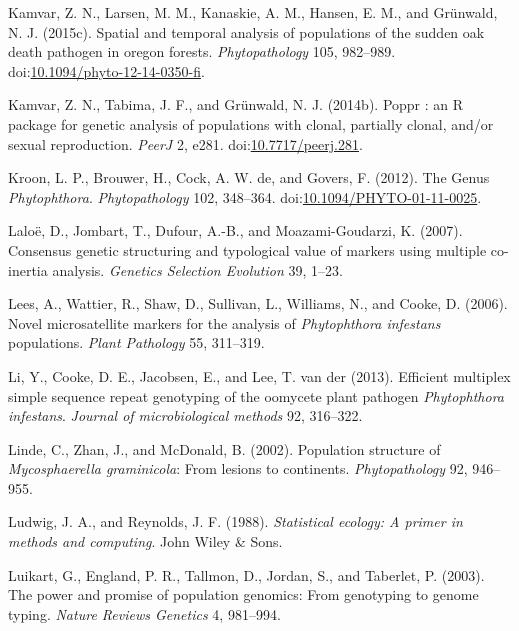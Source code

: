 \documentclass[double,12pt]{beavtex}
\begin{document}
  \hypertarget{ref-kamvar2015spatial}{}
  Kamvar, Z. N., Larsen, M. M., Kanaskie, A. M., Hansen, E. M., and
  Grünwald, N. J. (2015c). Spatial and temporal analysis of populations of
  the sudden oak death pathogen in oregon forests. \emph{Phytopathology}
  105, 982--989.
  doi:\href{https://doi.org/10.1094/phyto-12-14-0350-fi}{10.1094/phyto-12-14-0350-fi}.
  
  \hypertarget{ref-kamvar2014poppr}{}
  Kamvar, Z. N., Tabima, J. F., and Grünwald, N. J. (2014b). Poppr : an R
  package for genetic analysis of populations with clonal, partially
  clonal, and/or sexual reproduction. \emph{PeerJ} 2, e281.
  doi:\href{https://doi.org/10.7717/peerj.281}{10.7717/peerj.281}.
  
  \hypertarget{ref-kroon2012genus}{}
  Kroon, L. P., Brouwer, H., Cock, A. W. de, and Govers, F. (2012). The
  Genus \emph{Phytophthora}. \emph{Phytopathology} 102, 348--364.
  doi:\href{https://doi.org/10.1094/PHYTO-01-11-0025}{10.1094/PHYTO-01-11-0025}.
  
  \hypertarget{ref-laloe2007consensus}{}
  Laloë, D., Jombart, T., Dufour, A.-B., and Moazami-Goudarzi, K. (2007).
  Consensus genetic structuring and typological value of markers using
  multiple co-inertia analysis. \emph{Genetics Selection Evolution} 39,
  1--23.
  
  \hypertarget{ref-lees2006novel}{}
  Lees, A., Wattier, R., Shaw, D., Sullivan, L., Williams, N., and Cooke,
  D. (2006). Novel microsatellite markers for the analysis of
  \emph{Phytophthora infestans} populations. \emph{Plant Pathology} 55,
  311--319.
  
  \hypertarget{ref-li2013efficient}{}
  Li, Y., Cooke, D. E., Jacobsen, E., and Lee, T. van der (2013).
  Efficient multiplex simple sequence repeat genotyping of the oomycete
  plant pathogen \emph{Phytophthora infestans}. \emph{Journal of
  microbiological methods} 92, 316--322.
  
  \hypertarget{ref-linde2002population}{}
  Linde, C., Zhan, J., and McDonald, B. (2002). Population structure of
  \emph{Mycosphaerella graminicola}: From lesions to continents.
  \emph{Phytopathology} 92, 946--955.
  
  \hypertarget{ref-ludwig1988statistical}{}
  Ludwig, J. A., and Reynolds, J. F. (1988). \emph{Statistical ecology: A
  primer in methods and computing}. John Wiley \& Sons.
  
  \hypertarget{ref-luikart2003power}{}
  Luikart, G., England, P. R., Tallmon, D., Jordan, S., and Taberlet, P.
  (2003). The power and promise of population genomics: From genotyping to
  genome typing. \emph{Nature Reviews Genetics} 4, 981--994.
  
\end{document}
